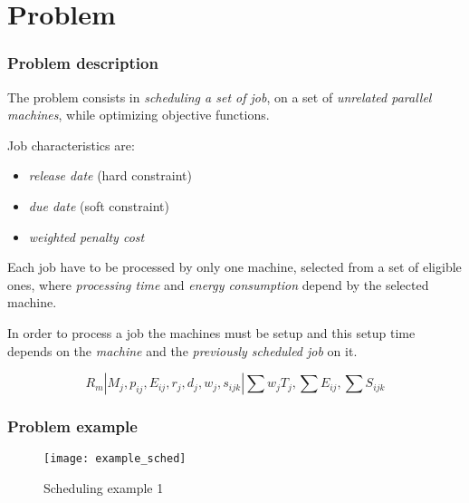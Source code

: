 \section{Problem}

\begin{frame}
\frametitle{Problem description}
The problem consists in \emph{scheduling a set of job}, on a set of \emph{unrelated parallel machines}, while optimizing objective functions.

\medskip


Job characteristics are: 
\begin{itemize}
	\item \emph{release date} (hard constraint)
	\item \emph{due date} (soft constraint)
	\item \emph{weighted penalty cost}%
\end{itemize}

\medskip

Each job have to be processed by only one machine, selected from a set of eligible ones, where \emph{processing time} and \emph{energy consumption} depend by the selected machine.

\medskip

In order to process a job the machines must be setup and this setup time depends on the \emph{machine} and the \emph{previously scheduled job} on it.

\begin{displaymath}
R_m | M_j,p_{ij},E_{ij},r_j,d_j,w_j,s_{ijk} | \displaystyle\sum w_j T_j, \displaystyle\sum E_{ij}, \displaystyle\sum S_{ijk}
\end{displaymath}

\end{frame}


\begin{frame} \frametitle{Problem example}
\begin{figure}[t]
	\label{fig:example_sched}
	\centering
	\texttt{[image: example\_sched]}
	\caption{Scheduling example 1}
\end{figure}
\end{frame}

